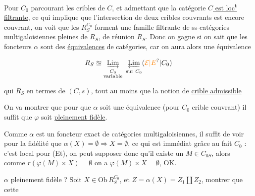 
Pour $C_0$ parcourant les cribles  de $C$,  et admettant que la catégorie  \uline{$C$ est loc\textsuperscript{t}} \uline{filtrante}, ce qui implique que l'intersection de deux cribles couvrants est encore couvrant, on voit que les $R_S^{C_0}$ forment une famille filtrante de ss-catégories multigaloisiennes pleines de $R_S$, de réunion $R_S$. Donc on gagne si on sait que les foncteurs $\alpha$ sont des \uline{équivalences} de catégories, car on aura alors une équivalence

\[
R_S\approxeq\mathop{\underrightarrow{\mathrm{Lim}}}\limits_{\substack{C_0\\\text{variable}}}\ \mathop{\underleftarrow{\mathrm{Lim}}}\limits_{\text{sur }C_0}(\unsure{\mathcal E|E}|C_0)
\]

qui  $R_S$ en termes de $(C,s)$,  tout au moins que la notion de \uline{crible admissible}


On va montrer que pour que $\alpha$ soit une équivalence (pour $C_0$ crible couvrant) il suffit que $\varphi$ soit \uline{pleinement fidèle}.


Comme $\alpha$ est un foncteur exact de catégories multigaloisiennes, il suffit de voir pour la fidélité que $\alpha(X)=\emptyset\Longrightarrow X=\emptyset$, ce qui est immédiat grâce au fait $C_0$  : c'est local pour (Et), on peut supposer donc qu'il existe un $M\in C_{0S}$,  alors comme $r(\varphi(M)\times X)=\emptyset$ on a $\varphi(M)\times X=\emptyset$, OK.

$\alpha$ pleinement fidèle ? Soit $X\in\mathrm{Ob}\,R_S^{C_0}$, et $Z=\alpha(X)=Z_1\amalg Z_2$, montrer que cette

